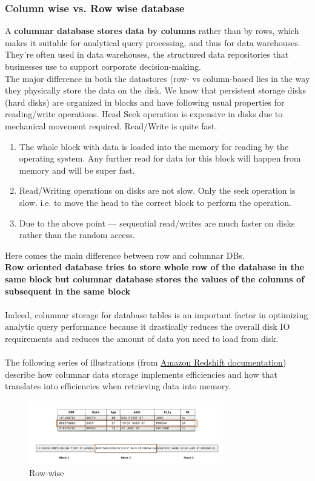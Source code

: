 \documentclass[10pt,a4paper]{article}
\newcommand{\nline}{\\~\\}
\begin{document}
\subsubsection{Column wise vs. Row wise database}
A \textbf{columnar database stores data by columns} rather than by rows, which makes it suitable for analytical query processing, and thus for data warehouses. They're often used in data warehouses, the structured data repositories that businesses use to support corporate decision-making. \\
The major difference in both the datastores (row- vs column-based lies in the way they physically store the data on the disk. We know that persistent storage disks (hard disks) are organized in blocks and have following usual properties for reading/write operations. Head Seek operation is expensive in disks due to mechanical movement required. Read/Write is quite fast.
\begin{enumerate}
	\item The whole block with data is loaded into the memory for reading by the operating system. Any further read for data for this block will happen from memory and will be super fast.
	\item Read/Writing operations on disks are not slow. Only the seek operation is slow. i.e. to move the head to the correct block to perform the operation.
	\item Due to the above point — sequential read/writes are much faster on disks rather than the random access.
\end{enumerate}
Here comes the main difference between row and columnar DBs. \\
\textbf{Row oriented database tries to store whole row of the database in the same block but columnar database stores the values of the columns of subsequent in the same block} 
\nline
Indeed, columnar storage for database tables is an important factor in optimizing analytic query performance because it drastically reduces the overall disk I\/O requirements and reduces the amount of data you need to load from disk.
\nline
The following series of illustrations (from \href{https://docs.aws.amazon.com/redshift/latest/dg/c_columnar_storage_disk_mem_mgmnt.html}{Amazon Redshift documentation}) describe how columnar data storage implements efficiencies and how that translates into efficiencies when retrieving data into memory.
\begin{figure}[h!]
 \hfill \includegraphics[width=240pt]{images/columnar-vs-row1.png}\hspace*{\fill}
 \caption{Row-wise}
\end{figure}  \\
\end{document}
